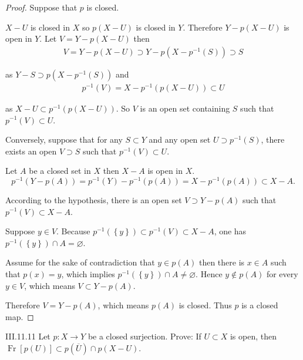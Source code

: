 \begin{proof}
    Suppose that \( p \) is closed.

    \( X - U \) is closed in \(X\) so \( p(X - U) \) is closed in \( Y \). Therefore \( Y - p(X - U) \) is open in \( Y \). Let \( V = Y - p(X - U) \) then
    \begingroup
    \allowdisplaybreaks%
    \begin{align*}
        V = Y - p(X - U) \supset Y - p(X - p^{-1}(S)) \supset S
    \end{align*}
    \endgroup

    as \( Y - S \supset p(X - p^{-1}(S)) \) and
    \begingroup
    \allowdisplaybreaks%
    \begin{align*}
        p^{-1}(V) = X - p^{-1}(p(X - U)) \subset U
    \end{align*}
    \endgroup

    as \( X - U \subset p^{-1}(p(X - U)) \). So \( V \) is an open set containing \( S \) such that \( p^{-1}(V) \subset U \).

    Conversely, suppose that for any \( S \subset Y \) and any open set \( U \supset p^{-1}(S) \), there exists an open \( V \supset S \) such that \( p^{-1}(V) \subset U \).

    Let \( A \) be a closed set in \( X \) then \( X - A \) is open in \( X \).
    \[
        p^{-1}(Y - p(A)) = p^{-1}(Y) - p^{-1}(p(A)) = X - p^{-1}(p(A)) \subset X - A.
    \]

    According to the hypothesis, there is an open set \( V \supset Y - p(A) \) such that \( p^{-1}(V) \subset X - A \).

    Suppose \( y \in V \). Because \( p^{-1}(\left\{ y \right\}) \subset p^{-1}(V) \subset X - A \), one has \( p^{-1}(\left\{ y \right\}) \cap A = \varnothing \).

    Assume for the sake of contradiction that \( y \in p(A) \) then there is \( x \in A \) such that \( p(x) = y \), which implies \( p^{-1}(\left\{ y \right\}) \cap A \ne \varnothing \). Hence \( y \notin p(A) \) for every \( y \in V \), which means \( V \subset Y - p(A) \).

    Therefore \( V = Y - p(A) \), which means \( p(A) \) is closed. Thus \( p \) is a closed map.
\end{proof}

\begin{problem}{III.11.11}
Let \( p: X \to Y \) be a closed surjection. Prove: If \( U \subset X \) is open, then \( \operatorname{Fr}[p(U)] \subset p(\overline{U}) \cap p(X - U) \).
\end{problem}

